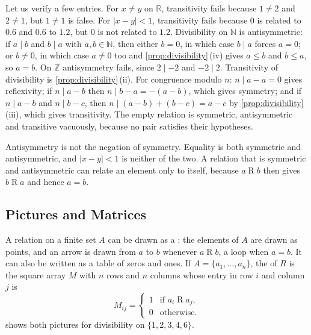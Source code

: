 Let us verify a few entries. For $x\ne y$ on $\mathbb R$, transitivity fails because $1\ne2$ and $2\ne1$, but $1\ne1$ is false. For $|x-y|<1$, transitivity fails because $0$ is related to $0.6$ and $0.6$ to $1.2$, but $0$ is not related to $1.2$. Divisibility on $\mathbb N$ is antisymmetric: if $a\mid b$ and $b\mid a$ with $a,b\in\mathbb N$, then either $b=0$, in which case $b\mid a$ forces $a=0$; or $b\ne0$, in which case $a\ne0$ too and \cref{prop:divisibility}\,(iv) gives $a\le b$ and $b\le a$, so $a=b$. On $\mathbb Z$ antisymmetry fails, since $2\mid-2$ and $-2\mid2$. Transitivity of divisibility is \cref{prop:divisibility}\,(ii). For congruence modulo $n$: $n\mid a-a=0$ gives reflexivity; if $n\mid a-b$ then $n\mid b-a=-(a-b)$, which gives symmetry; and if $n\mid a-b$ and $n\mid b-c$, then $n\mid(a-b)+(b-c)=a-c$ by \cref{prop:divisibility}\,(iii), which gives transitivity. The empty relation is symmetric, antisymmetric and transitive vacuously, because no pair satisfies their hypotheses.

Antisymmetry is not the negation of symmetry. Equality is both symmetric and antisymmetric, and $|x-y|<1$ is neither of the two. A relation that is symmetric and antisymmetric can relate an element only to itself, because $a\mathrel{R}b$ then gives $b\mathrel{R}a$ and hence $a=b$.

\subsection{Pictures and Matrices}

A relation on a finite set $A$ can be drawn as a : the elements of $A$ are drawn as points, and an arrow is drawn from $a$ to $b$ whenever $a\mathrel{R}b$, a loop when $a=b$. It can also be written as a table of zeros and ones. If $A=\{a_1,\ldots,a_n\}$, the  of $R$ is the square array $M$ with $n$ rows and $n$ columns whose entry in row $i$ and column $j$ is
\[
M_{ij}=\begin{cases}1&\text{if }a_i\mathrel{R}a_j,\\0&\text{otherwise.}\end{cases}
\]
 shows both pictures for divisibility on $\{1,2,3,4,6\}$.


